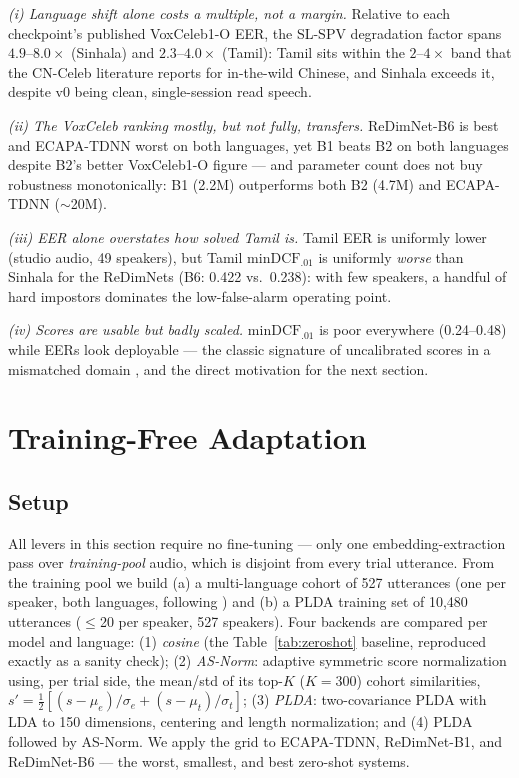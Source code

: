 \documentclass[journal]{IEEEtran}
\newcommand{\dcf}{\mathrm{minDCF}}
\begin{document}
\emph{(i) Language shift alone costs a multiple, not a margin.}
Relative to each checkpoint's published VoxCeleb1-O EER, the SL-SPV
degradation factor spans $4.9$--$8.0\times$ (Sinhala) and
$2.3$--$4.0\times$ (Tamil): Tamil sits within the $2$--$4\times$ band
that the CN-Celeb literature \cite{fan2020cnceleb} reports for
in-the-wild Chinese, and Sinhala exceeds it, despite v0 being clean,
single-session read speech.

\emph{(ii) The VoxCeleb ranking mostly, but not fully, transfers.}
ReDimNet-B6 is best and ECAPA-TDNN worst on both languages, yet B1
beats B2 on both languages despite B2's better VoxCeleb1-O figure ---
and parameter count does not buy robustness monotonically: B1 (2.2M)
outperforms both B2 (4.7M) and ECAPA-TDNN ($\sim$20M).

\emph{(iii) EER alone overstates how solved Tamil is.} Tamil EER is
uniformly lower (studio audio, 49 speakers), but Tamil
$\dcf_{.01}$ is uniformly \emph{worse} than Sinhala for the ReDimNets
(B6: 0.422 vs.\ 0.238): with few speakers, a handful of hard
impostors dominates the low-false-alarm operating point.

\emph{(iv) Scores are usable but badly scaled.} $\dcf_{.01}$ is poor
everywhere (0.24--0.48) while EERs look deployable --- the classic
signature of uncalibrated scores in a mismatched domain
\cite{matejka2017analysis, thienpondt2022tackling}, and the direct
motivation for the next section.

\section{Training-Free Adaptation}
\label{sec:adapt}

\subsection{Setup}
\label{ssec:adaptsetup}

All levers in this section require no fine-tuning --- only one
embedding-extraction pass over \emph{training-pool} audio, which is
disjoint from every trial utterance. From the training pool
we build (a) a multi-language cohort of 527 utterances (one per
speaker, both languages, following \cite{matejka2017analysis}) and
(b) a PLDA training set of 10{,}480 utterances ($\le$20 per speaker,
527 speakers). Four backends are compared per model and language:
(1) \emph{cosine} (the Table~\ref{tab:zeroshot} baseline, reproduced
exactly as a sanity check); (2) \emph{AS-Norm}: adaptive symmetric
score normalization using, per trial side, the mean/std of its
top-$K$ ($K{=}300$) cohort similarities,
$s' = \tfrac{1}{2}\!\left[(s-\mu_e)/\sigma_e +
(s-\mu_t)/\sigma_t\right]$;
(3) \emph{PLDA}: two-covariance PLDA \cite{sizov2014unifying,
kenny2010} with LDA to 150 dimensions, centering and length
normalization; and (4) PLDA followed by AS-Norm. We apply the grid to ECAPA-TDNN,
ReDimNet-B1, and ReDimNet-B6 --- the worst, smallest, and best
zero-shot systems.
\end{document}
